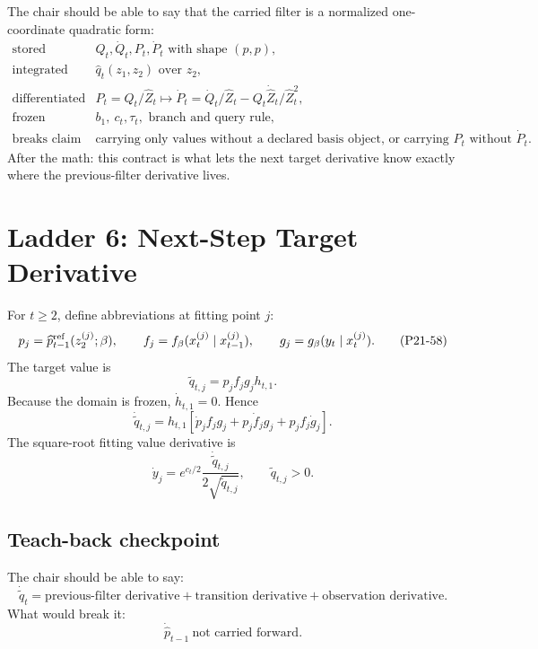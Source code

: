 \documentclass[11pt]{article}
\newcommand{\widehatZ}{\widehat Z}
\newcommand{\widehatp}{\widehat p}
\begin{document}
The chair should be able to say that the carried filter is a normalized
one-coordinate quadratic form:
\[
\begin{array}{ll}
\text{stored} & Q_t,\dot Q_t,P_t,\dot P_t
    \text{ with shape }(p,p),\\[1mm]
\text{integrated} & \widehat q_t(z_1,z_2)\text{ over }z_2,\\[1mm]
\text{differentiated} &
    P_t=Q_t/\widehatZ_t
    \mapsto
    \dot P_t=\dot Q_t/\widehatZ_t
    -Q_t\dot{\widehatZ}_t/\widehatZ_t^2,\\[1mm]
\text{frozen} & b_1,\ c_t,\tau_t,\text{ branch and query rule},\\[1mm]
\text{breaks claim} &
    \text{carrying only values without a declared basis object, or carrying }
    P_t \text{ without } \dot P_t.
\end{array}
\tag{P21-57i}
\]
After the math: this contract is what lets the next target derivative know
exactly where the previous-filter derivative lives.

\section{Ladder 6: Next-Step Target Derivative}

For \(t\ge2\), define abbreviations at fitting point \(j\):
\[
    p_j=\widehatp_{t-1}^{\rm ref}(z_2^{(j)};\beta),
    \qquad
    f_j=f_\beta(x_t^{(j)}\mid x_{t-1}^{(j)}),
    \qquad
    g_j=g_\beta(y_t\mid x_t^{(j)}).
    \tag{P21-58}
\]
The target value is
\[
    \widetilde q_{t,j}=p_j f_j g_j h_{t,1}.
    \tag{P21-59}
\]
Because the domain is frozen, \(\dot h_{t,1}=0\).  Hence
\[
    \dot{\widetilde q}_{t,j}
    =
    h_{t,1}
    \left[
    \dot p_j f_jg_j
    +
    p_j\dot f_jg_j
    +
    p_jf_j\dot g_j
    \right].
    \tag{P21-60}
\]
The square-root fitting value derivative is
\[
    \dot y_j
    =
    e^{c_t/2}
    \frac{\dot{\widetilde q}_{t,j}}
    {2\sqrt{\widetilde q_{t,j}}},
    \qquad
    \widetilde q_{t,j}>0.
    \tag{P21-61}
\]

\subsection*{Teach-back checkpoint}

The chair should be able to say:
\[
    \dot{\widetilde q}_{t}
    =
    \text{previous-filter derivative}
    +
    \text{transition derivative}
    +
    \text{observation derivative}.
    \tag{P21-62}
\]
What would break it:
\[
    \dot{\widehatp}_{t-1}\ \text{not carried forward}.
    \tag{P21-63}
\]
\end{document}
